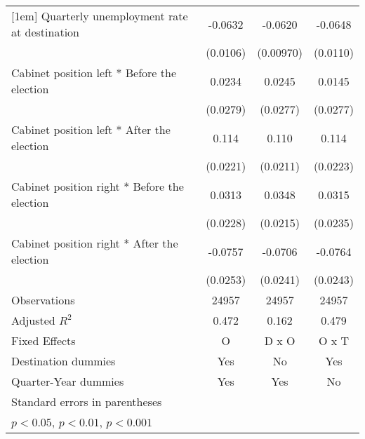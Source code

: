 \begin{table}[htbp]
\begin{tabular}{l*{3}{c}}
[1em]
Quarterly unemployment rate at destination&     -0.0632\sym{***}&     -0.0620\sym{***}&     -0.0648\sym{***}\\
                    &    (0.0106)         &   (0.00970)         &    (0.0110)         \\
[1em]
Cabinet position left * Before the election&      0.0234         &      0.0245         &      0.0145         \\
                    &    (0.0279)         &    (0.0277)         &    (0.0277)         \\
[1em]
Cabinet position left * After the election&       0.114\sym{***}&       0.110\sym{***}&       0.114\sym{***}\\
                    &    (0.0221)         &    (0.0211)         &    (0.0223)         \\
[1em]
Cabinet position right * Before the election&      0.0313         &      0.0348         &      0.0315         \\
                    &    (0.0228)         &    (0.0215)         &    (0.0235)         \\
[1em]
Cabinet position right * After the election&     -0.0757\sym{**} &     -0.0706\sym{**} &     -0.0764\sym{**} \\
                    &    (0.0253)         &    (0.0241)         &    (0.0243)         \\
\hline
Observations        &       24957         &       24957         &       24957         \\
Adjusted \(R^{2}\)  &       0.472         &       0.162         &       0.479         \\
Fixed Effects       &           O         &       D x O         &       O x T         \\
Destination dummies &         Yes         &          No         &         Yes         \\
Quarter-Year dummies&         Yes         &         Yes         &          No         \\
\hline\hline
\multicolumn{4}{l}{\footnotesize Standard errors in parentheses}\\
\multicolumn{4}{l}{\footnotesize \sym{*} \(p<0.05\), \sym{**} \(p<0.01\), \sym{***} \(p<0.001\)}\\
\end{tabular}
\end{table}
